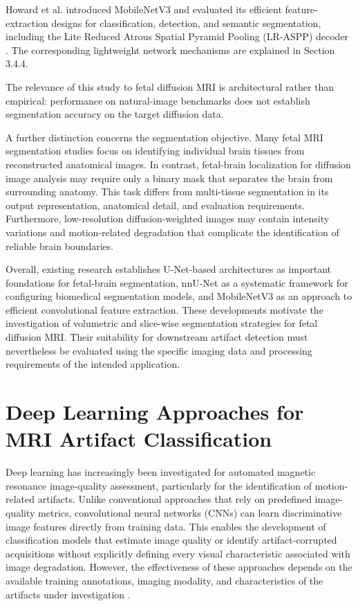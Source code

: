 Howard et al. introduced MobileNetV3 and evaluated its efficient feature-extraction designs for classification, detection, and semantic segmentation, including the Lite Reduced Atrous Spatial Pyramid Pooling (LR-ASPP) decoder \autocite{howard2019mobilenetv3}. The corresponding lightweight network mechanisms are explained in Section 3.4.4.

The relevance of this study to fetal diffusion MRI is architectural rather than empirical: performance on natural-image benchmarks does not establish segmentation accuracy on the target diffusion data.

A further distinction concerns the segmentation objective. Many fetal MRI segmentation studies focus on identifying individual brain tissues from reconstructed anatomical images. In contrast, fetal-brain localization for diffusion image analysis may require only a binary mask that separates the brain from surrounding anatomy. This task differs from multi-tissue segmentation in its output representation, anatomical detail, and evaluation requirements. Furthermore, low-resolution diffusion-weighted images may contain intensity variations and motion-related degradation that complicate the identification of reliable brain boundaries.

Overall, existing research establishes U-Net-based architectures as important foundations for fetal-brain segmentation, nnU-Net as a systematic framework for configuring biomedical segmentation models, and MobileNetV3 as an approach to efficient convolutional feature extraction. These developments motivate the investigation of volumetric and slice-wise segmentation strategies for fetal diffusion MRI. Their suitability for downstream artifact detection must nevertheless be evaluated using the specific imaging data and processing requirements of the intended application.

\section{Deep Learning Approaches for MRI Artifact Classification}

Deep learning has increasingly been investigated for automated magnetic resonance image-quality assessment, particularly for the identification of motion-related artifacts. Unlike conventional approaches that rely on predefined image-quality metrics, convolutional neural networks (CNNs) can learn discriminative image features directly from training data. This enables the development of classification models that estimate image quality or identify artifact-corrupted acquisitions without explicitly defining every visual characteristic associated with image degradation. However, the effectiveness of these approaches depends on the available training annotations, imaging modality, and characteristics of the artifacts under investigation \autocite{oksuz2019cardiac,vakli2023motion}.

